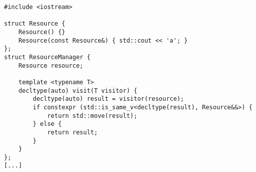 \begin{lstlisting}[title=\href{https://godbolt.org/z/YF3jpV}{\texttt{godbolt.org/z/YF3jpV}}]
#include <iostream>

struct Resource {
    Resource() {}
    Resource(const Resource&) { std::cout << 'a'; }
};
struct ResourceManager {
    Resource resource;

    template <typename T>
    decltype(auto) visit(T visitor) {
        decltype(auto) result = visitor(resource);
        if constexpr (std::is_same_v<decltype(result), Resource&&>) {
            return std::move(result);
        } else {
            return result;
        }
    }
};
[...]
\end{lstlisting}
